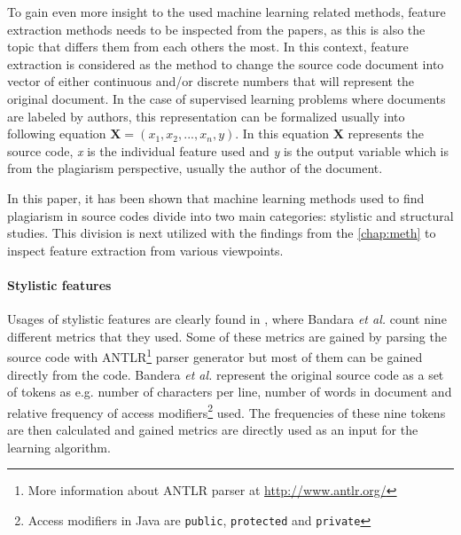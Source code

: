 \documentclass[english]{tktltiki2}
\theoremstyle{definition}
\theoremstyle{remark}
\begin{document}
To gain even more insight to the used machine learning related methods,  feature extraction methods needs to be inspected from the papers, as this is also the topic that differs them from each others the most. In this context, feature extraction is considered as the method to change the source code document into vector of either continuous and/or discrete numbers that will represent the original document. In the case of supervised learning problems where documents are labeled by authors, this representation can be formalized usually into following equation $\mathbf{X} = (x_1, x_2,...,x_n, y)$. In this equation \textbf{X} represents the source code, \emph{x} is the individual feature used and \emph{y} is the output variable which is from the plagiarism perspective, usually the author of the document. 

In this paper, it has been shown that machine learning methods used to find plagiarism in source codes divide into two main categories: stylistic and structural studies. This division is next utilized with the findings from the \autoref{chap:meth} to inspect feature extraction from various viewpoints. %

\paragraph{Stylistic features}
Usages of stylistic features are clearly found in \cite{bandara2011machine}, where Bandara \textit{et al.} count nine different metrics that they used. Some of these metrics are gained by parsing the source code with ANTLR\footnote{More information about ANTLR parser at \url{http://www.antlr.org/}} parser generator but most of them can be gained directly from the code. Bandera \textit{et al.} represent the original source code as a set of tokens as e.g.  number of characters per line, number of words in document and relative frequency of access modifiers\footnote{Access modifiers in Java are \texttt{public}, \texttt{protected} and \texttt{private}} used.  The frequencies of these nine tokens are then calculated and gained metrics are directly used as an input for the learning algorithm. 
\end{document}
